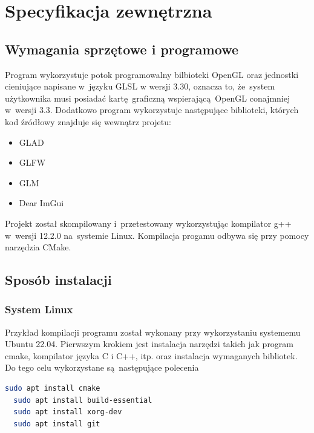 \chapter{Specyfikacja zewnętrzna}
\label{ch:04}

\section{Wymagania sprzętowe i programowe}

Program wykorzystuje potok programowalny bilbioteki OpenGL oraz jednostki cieniujące napisane w~języku GLSL w wersji 3.30, oznacza to, że~system użytkownika musi posiadać kartę graficzną wspierającą OpenGL conajmniej w~wersji 3.3.
Dodatkowo program wykorzystuje następujące biblioteki, których kod źródłowy znajduje się wewnątrz projetu:
\begin{itemize}
\item GLAD
\item GLFW
\item GLM
\item Dear ImGui
\end{itemize}

Projekt został skompilowany i~przetestowany wykorzystując kompilator g++
w~wersji 12.2.0 na~systemie Linux. Kompilacja progamu odbywa się przy pomocy narzędzia CMake.

\section{Sposób instalacji}
\subsection{System Linux}
Przykład kompilacji programu został wykonany przy wykorzystaniu systememu Ubuntu 22.04. Pierwszym krokiem jest instalacja narzędzi takich jak program cmake, kompilator języka C i C++, itp. oraz instalacja wymaganych bibliotek.
Do tego celu wykorzystane są następujące polecenia
\lstset{basicstyle=\ttfamily, language=bash}
\begin{lstlisting}[language=bash]
  sudo apt install cmake
  sudo apt install build-essential
  sudo apt install xorg-dev
  sudo apt install git
\end{lstlisting}

